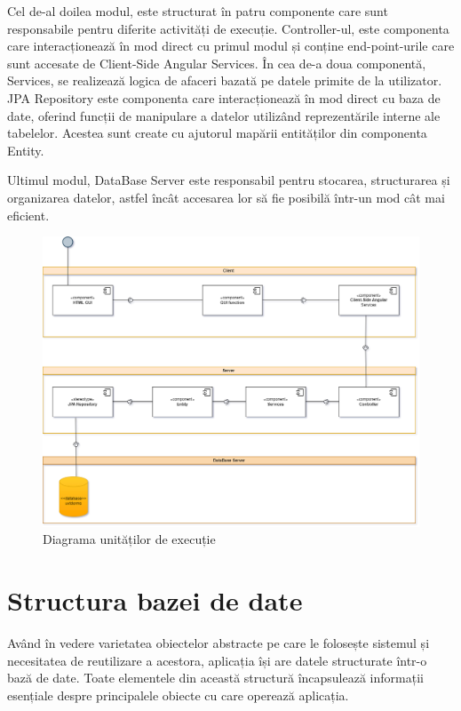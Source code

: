 \documentclass[12pt,a4paper]{report}
\theoremstyle{definition}
\theoremstyle{remark}
\begin{document}
\par Cel de-al doilea modul, este structurat în patru componente care sunt responsabile pentru diferite activități de execuție. Controller-ul, este componenta care \textnormal{in\-te\-rac\-țio\-nea\-ză} în mod direct cu primul modul și conține end-point-urile care sunt accesate de  Client-Side Angular Services. În cea de-a doua componentă, Services, se realizează logica de afaceri bazată pe datele primite de la utilizator. JPA Repository este componenta care interacționează în mod direct cu baza de date, oferind funcții de manipulare a datelor utilizând reprezentările interne ale tabelelor. Acestea sunt create cu ajutorul mapării entităților din componenta Entity.

\par Ultimul modul, DataBase Server este responsabil pentru stocarea, structurarea și organizarea datelor, astfel încât accesarea lor să fie posibilă într-un mod cât mai eficient.

\begin{figure}[H]
    \centering
    \includegraphics[width=0.75\linewidth]{resurse/diagrame/DiagramaDEEXECUTIE.drawio.png}
    \caption{Diagrama unităților de execuție}
\end{figure}

\section{Structura bazei de date}\label{sec:architectura-bazei-de-date}
\par Având în vedere varietatea obiectelor abstracte pe care le folosește sistemul și necesitatea de reutilizare a acestora, aplicația își are datele structurate într-o bază de date. Toate elementele din această structură încapsulează informații esențiale despre principalele obiecte cu care operează aplicația.
\end{document}
